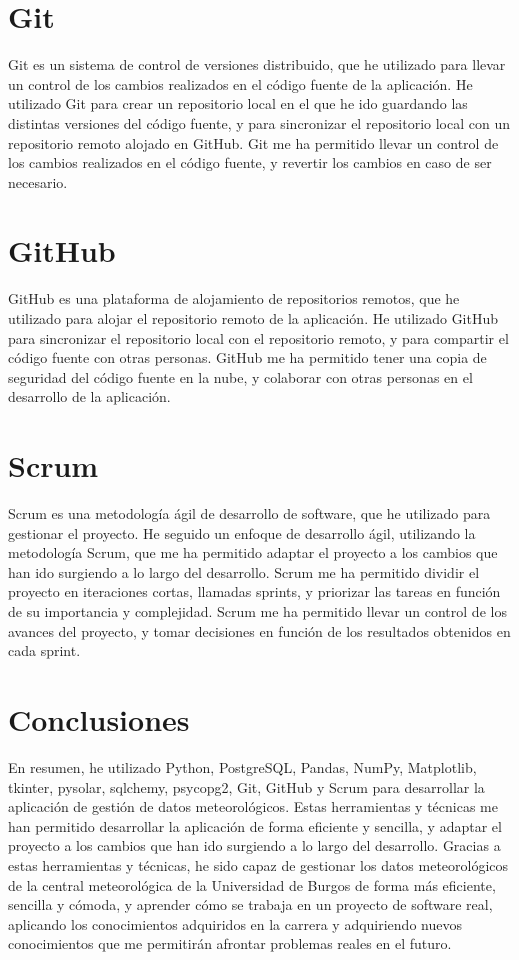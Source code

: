 \section{Git}
Git es un sistema de control de versiones distribuido, que he utilizado para llevar un control de los cambios realizados en el código fuente de la aplicación. He utilizado Git para crear un repositorio local en el que he ido guardando las distintas versiones del código fuente, y para sincronizar el repositorio local con un repositorio remoto alojado en GitHub. Git me ha permitido llevar un control de los cambios realizados en el código fuente, y revertir los cambios en caso de ser necesario.\newline
\section{GitHub}
GitHub es una plataforma de alojamiento de repositorios remotos, que he utilizado para alojar el repositorio remoto de la aplicación. He utilizado GitHub para sincronizar el repositorio local con el repositorio remoto, y para compartir el código fuente con otras personas. GitHub me ha permitido tener una copia de seguridad del código fuente en la nube, y colaborar con otras personas en el desarrollo de la aplicación.\newline
\section{Scrum}
Scrum es una metodología ágil de desarrollo de software, que he utilizado para gestionar el proyecto. He seguido un enfoque de desarrollo ágil, utilizando la metodología Scrum, que me ha permitido adaptar el proyecto a los cambios que han ido surgiendo a lo largo del desarrollo. Scrum me ha permitido dividir el proyecto en iteraciones cortas, llamadas sprints, y priorizar las tareas en función de su importancia y complejidad. Scrum me ha permitido llevar un control de los avances del proyecto, y tomar decisiones en función de los resultados obtenidos en cada sprint.\newline
\section{Conclusiones}
En resumen, he utilizado Python, PostgreSQL, Pandas, NumPy, Matplotlib, tkinter, pysolar, sqlchemy, psycopg2, Git, GitHub y Scrum para desarrollar la aplicación de gestión de datos meteorológicos. Estas herramientas y técnicas me han permitido desarrollar la aplicación de forma eficiente y sencilla, y adaptar el proyecto a los cambios que han ido surgiendo a lo largo del desarrollo. Gracias a estas herramientas y técnicas, he sido capaz de gestionar los datos meteorológicos de la central meteorológica de la Universidad de Burgos de forma más eficiente, sencilla y cómoda, y aprender cómo se trabaja en un proyecto de software real, aplicando los conocimientos adquiridos en la carrera y adquiriendo nuevos conocimientos que me permitirán afrontar problemas reales en el futuro.\newline



